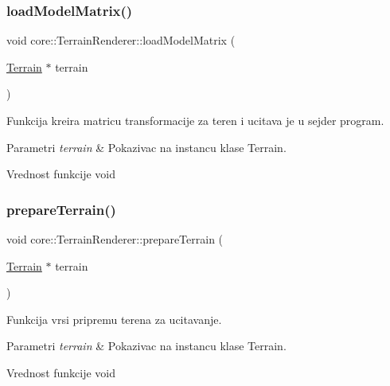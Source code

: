 \subsubsection{\texorpdfstring{load\+Model\+Matrix()}{loadModelMatrix()}}
{\footnotesize\ttfamily void core\+::\+Terrain\+Renderer\+::load\+Model\+Matrix (\begin{DoxyParamCaption}\item[{\hyperlink{classterrain_1_1Terrain}{Terrain} $\ast$}]{terrain }\end{DoxyParamCaption})}



Funkcija kreira matricu transformacije za teren i ucitava je u sejder program. 


\begin{DoxyParams}{Parametri}
{\em terrain} & Pokazivac na instancu klase Terrain. \\
\hline
\end{DoxyParams}
\begin{DoxyReturn}{Vrednost funkcije}
void 
\end{DoxyReturn}
\mbox{\label{classcore_1_1TerrainRenderer_ad4e7d88767cdfc19ee07bf3558f6c1f0}} 
\subsubsection{\texorpdfstring{prepare\+Terrain()}{prepareTerrain()}}
{\footnotesize\ttfamily void core\+::\+Terrain\+Renderer\+::prepare\+Terrain (\begin{DoxyParamCaption}\item[{\hyperlink{classterrain_1_1Terrain}{Terrain} $\ast$}]{terrain }\end{DoxyParamCaption})}



Funkcija vrsi pripremu terena za ucitavanje. 


\begin{DoxyParams}{Parametri}
{\em terrain} & Pokazivac na instancu klase Terrain. \\
\hline
\end{DoxyParams}
\begin{DoxyReturn}{Vrednost funkcije}
void 
\end{DoxyReturn}
\mbox{\label{classcore_1_1TerrainRenderer_a1f2aaf851e780fc8f78aa5bb3cd1b512}} 
